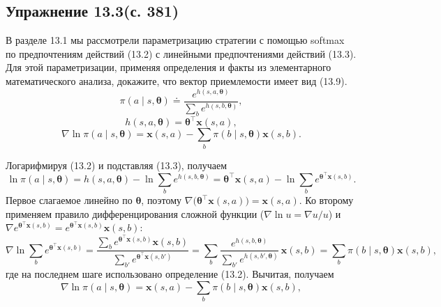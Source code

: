 \subsection{Упражнение 13.3(с. 381)}
В разделе 13.1 мы рассмотрели параметризацию стратегии с помощью softmax по
предпочтениям действий (13.2) с линейными предпочтениями действий (13.3). Для
этой параметризации, применяя определения и факты из элементарного
математического анализа, докажите, что вектор приемлемости имеет вид (13.9).
\begin{equation}
    \pi(a\mid s,\boldsymbol\theta) \doteq
    \frac{e^{h(s,a,\boldsymbol\theta)}}{\sum_b e^{h(s,b,\boldsymbol\theta)}},
    \tag{13.2}
\end{equation}
\begin{equation}
    h(s,a,\boldsymbol\theta) = \boldsymbol\theta^\top\mathbf x(s,a),
    \tag{13.3}
\end{equation}
\begin{equation}
    \nabla\ln\pi(a\mid s,\boldsymbol\theta) = \mathbf x(s,a)
    - \sum_b \pi(b\mid s,\boldsymbol\theta)\mathbf x(s,b).
    \tag{13.9}
\end{equation}
\begin{solution}
    Логарифмируя (13.2) и подставляя (13.3), получаем
    \[
        \ln\pi(a\mid s,\boldsymbol\theta)
        = h(s,a,\boldsymbol\theta) - \ln\sum_b e^{h(s,b,\boldsymbol\theta)}
        = \boldsymbol\theta^\top\mathbf x(s,a)
        - \ln\sum_b e^{\boldsymbol\theta^\top\mathbf x(s,b)}.
    \]
    Первое слагаемое линейно по $\boldsymbol\theta$, поэтому
    $\nabla\big(\boldsymbol\theta^\top\mathbf x(s,a)\big) = \mathbf x(s,a)$.
    Ко второму применяем правило дифференцирования сложной функции
    ($\nabla\ln u = \nabla u/u$) и $\nabla e^{\boldsymbol\theta^\top\mathbf x(s,b)}
    = e^{\boldsymbol\theta^\top\mathbf x(s,b)}\mathbf x(s,b)$:
    \[
        \nabla\ln\sum_b e^{\boldsymbol\theta^\top\mathbf x(s,b)}
        = \frac{\sum_b e^{\boldsymbol\theta^\top\mathbf x(s,b)}\mathbf x(s,b)}
               {\sum_{b'} e^{\boldsymbol\theta^\top\mathbf x(s,b')}}
        = \sum_b \frac{e^{h(s,b,\boldsymbol\theta)}}{\sum_{b'} e^{h(s,b',\boldsymbol\theta)}}\,\mathbf x(s,b)
        = \sum_b \pi(b\mid s,\boldsymbol\theta)\mathbf x(s,b),
    \]
    где на последнем шаге использовано определение (13.2). Вычитая, получаем
    \[
        \nabla\ln\pi(a\mid s,\boldsymbol\theta)
        = \mathbf x(s,a) - \sum_b \pi(b\mid s,\boldsymbol\theta)\mathbf x(s,b),
    \]
\end{solution}

